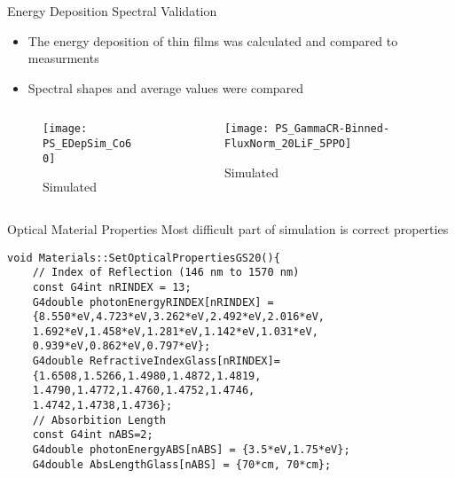 \begin{frame}{Energy Deposition Spectral Validation}
  \begin{itemize}
    \item The energy deposition of thin films was calculated and compared to measurments
    \item Spectral shapes and average values were compared
  \end{itemize}
  \begin{columns}[onlytextwidth]
  \begin{column}{0.45\textwidth}
    \centering
    \begin{figure}
    	\texttt{[image: PS\_EDepSim\_Co60]}
      \caption{Simulated}
    \end{figure}
  \end{column}
  \begin{column}{0.45\textwidth}
    \centering
    \begin{figure}
   	  \texttt{[image: PS\_GammaCR-Binned-FluxNorm\_20LiF\_5PPO]}
      \caption{Simulated}
    \end{figure}
  \end{column}
  \end{columns}
\hyperlink{G4Main}{}
\hyperlink{toc}{}
\end{frame}
\begin{frame}[fragile]{Optical Material Properties}
Most difficult part of simulation is correct properties
\begin{lstlisting}
void Materials::SetOpticalPropertiesGS20(){
    // Index of Reflection (146 nm to 1570 nm)
    const G4int nRINDEX = 13;
    G4double photonEnergyRINDEX[nRINDEX] = 
    {8.550*eV,4.723*eV,3.262*eV,2.492*eV,2.016*eV,
    1.692*eV,1.458*eV,1.281*eV,1.142*eV,1.031*eV, 
    0.939*eV,0.862*eV,0.797*eV};
    G4double RefractiveIndexGlass[nRINDEX]=
    {1.6508,1.5266,1.4980,1.4872,1.4819,    
    1.4790,1.4772,1.4760,1.4752,1.4746,    
    1.4742,1.4738,1.4736};
    // Absorbition Length
    const G4int nABS=2;
    G4double photonEnergyABS[nABS] = {3.5*eV,1.75*eV};
    G4double AbsLengthGlass[nABS] = {70*cm, 70*cm};  
\end{lstlisting}
\hyperlink{G4LightMain}{}
\hyperlink{toc}{}
\end{frame}
